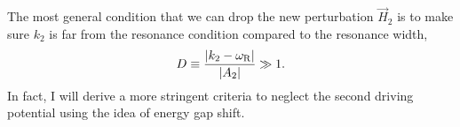 The most general condition that we can drop the new perturbation $\vec{H}_2$ is to make sure $k_2$ is far from the resonance condition compared to the resonance width,
\begin{equation}
D \equiv \frac{\lvert k_2 -\omega_{\mathrm R}\rvert}{\lvert A_2\rvert} \gg 1.
\end{equation}
In fact, I will derive a more stringent criteria to neglect the second driving potential using the idea of energy gap shift.
